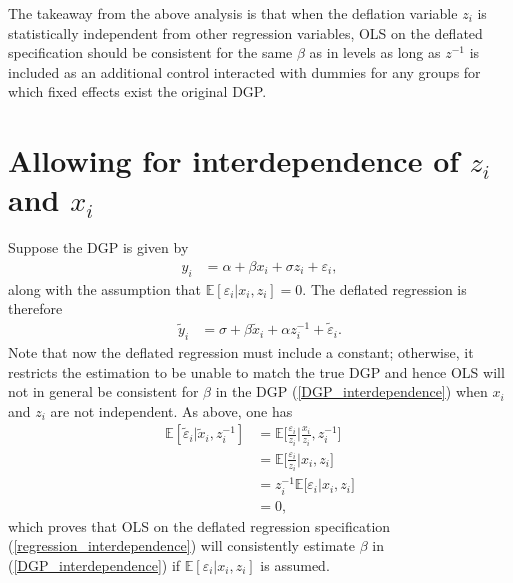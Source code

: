 \documentclass[11pt,english]{article}
\theoremstyle{definition}
\begin{document}
The takeaway from the above analysis is that when the deflation variable $z_i$ is statistically independent from other regression variables, OLS on the deflated specification should be consistent for the same $\beta$ as in levels as long as $z^{-1}$ is included as an additional control interacted with dummies for any groups for which fixed effects exist the original DGP. 

\section{Allowing for interdependence of $z_i$ and $x_i$}

Suppose the DGP is given by 
\begin{align}
	y_i &= \alpha + \beta x_i + \sigma z_i + \varepsilon_i, \label{DGP_interdependence}
\end{align} 
along with the assumption that $\mathbb{E}[\varepsilon_i | x_i , z_i] = 0$. The deflated regression is therefore
\begin{align}
	\tilde{y}_i &= \sigma + \beta \tilde{x}_i  + \alpha z_i^{-1} + \tilde{\varepsilon}_i. \label{regression_interdependence}
\end{align}
Note that now the deflated regression must include a constant; otherwise, it restricts the estimation to be unable to match the true DGP and hence OLS will not in general be consistent for $\beta$ in the DGP (\ref{DGP_interdependence}) when $x_i$ and $z_i$ are not independent. As above, one has
\begin{align}
	\mathbb{E}[\tilde{\varepsilon}_i | \tilde{x}_i, z_i^{-1}] &= \mathbb{E}\Big[\frac{\varepsilon_i}{z_i} \Big| \frac{x_i}{z_i}, z_i^{-1}\Big] \\
	&= \mathbb{E}\Big[\frac{\varepsilon_i}{z_i} \Big| x_i , z_i \Big] \\
	&= z_i^{-1} \mathbb{E}\Big[\varepsilon_i  \Big| x_i , z_i \Big] \\
	&= 0,
\end{align}
which proves that OLS on the deflated regression specification (\ref{regression_interdependence}) will consistently estimate $\beta$ in (\ref{DGP_interdependence}) if $\mathbb{E}[\varepsilon_i | x_i, z_i]$ is assumed. 
\end{document}
